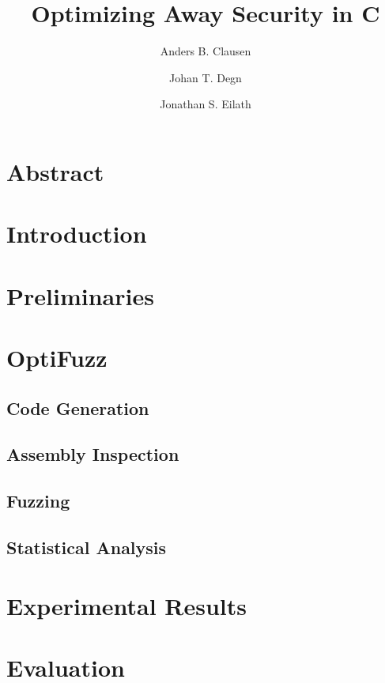 \documentclass[10pt]{article}
\title{
  Optimizing Away Security in C
}
\author{Anders B. Clausen \and Johan T. Degn \and Jonathan S. Eilath}
\begin{document}
\maketitle
\thispagestyle{empty}


\section*{Abstract}

\section{Introduction}


\section{Preliminaries}


\section{OptiFuzz}

\subsection{Code Generation}\label{sec:code-generation}

\subsection{Assembly Inspection}

\subsection{Fuzzing}

\subsection{Statistical Analysis}


\section{Experimental Results}


\section{Evaluation}

\end{document}

